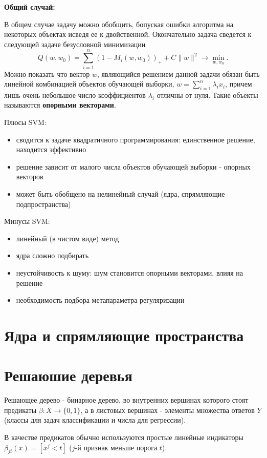 \textbf{Общий случай:}

В общем случае задачу можно обобщить, бопуская ошибки алгоритма на некоторых объектах исведя ее к двойственной. Окончательно задача сведется к следующей задаче безусловной минимизации
$$
Q(w, w_0) = \sum_{i=1}^n\left(1 - M_i(w, w_0)\right)_{+} + C\|w\|^2 \rightarrow \min_{w, w_0}.
$$
Можно показать что вектор $w$, являющийся решением данной задачи обязан быть линейной комбинацией объектов обучающей выборки, $w = \sum_{i=1}^n\lambda_ix_i$, причем лишь очень небольшое число коэффициентов $\lambda_i$ отличны от нуля. Такие объекты называются \textbf{опорными векторами}.

Плюсы SVM:
\begin{itemize}
    \item сводится к задаче квадратичного программирования: единственное решение, находится эффективно
    \item решение зависит от малого числа объектов обучающей выборки - опорных векторов
    \item может быть обобщено на нелинейный случай (ядра, спрямляющие подпространства)
\end{itemize}
Минусы SVM:
\begin{itemize}
    \item линейный (в чистом виде) метод
    \item ядра сложно подбирать
    \item неустойчивость к шуму: шум становится опорными векторами, влияя на решение
    \item необходимость подбора метапараметра регуляризации
\end{itemize}


\section{Ядра и спрямляющие пространства}


\section{Решаюшие деревья}

Решающее дерево - бинарное дерево, во внутренних вершинах которого стоят предикаты $\beta: X \rightarrow \{0, 1\}$, а в листовых вершинах - элементы множества ответов $Y$ (классы для задач классификации и числа для регрессии).

В качестве предикатов обычно используются простые линейные индикаторы $\beta_{jt}(x) = [x^j < t]$ ($j$-й признак меньше порога $t$).

